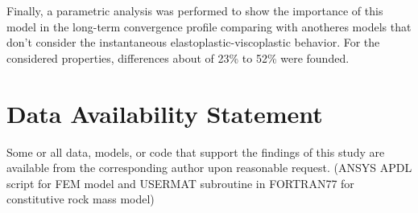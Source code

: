 \documentclass[Journal,letterpaper]{ascelike-new}
\begin{document}
Finally, a parametric analysis was performed to show the importance of this model in the long-term convergence profile comparing with anotheres models that don't consider the instantaneous elastoplastic-viscoplastic behavior. For the considered properties, differences about of 23\% to 52\% were founded.

\section{Data Availability Statement}

Some or all data, models, or code that support the findings of this study are available from the corresponding author upon reasonable request. (ANSYS APDL script for FEM model and USERMAT subroutine in FORTRAN77 for constitutive rock mass model)

\pagebreak
%
%
%
%
%
%
%

%
\end{document}
